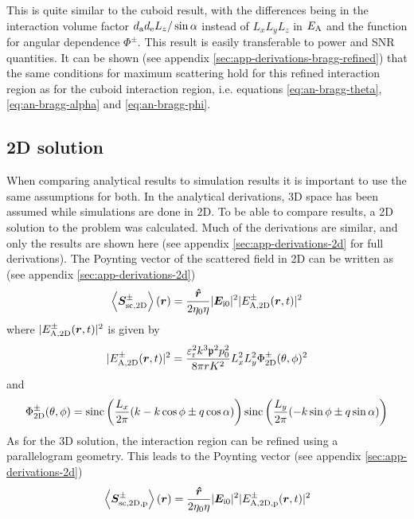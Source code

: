\documentclass[11pt,twoside]{eitExjobb}
\begin{document}
	This is quite similar to the cuboid result, with the differences being in the interaction volume factor $d_{\mathrm{a}} d_{\mathrm{e}} L_{z}/\sin{\alpha}$ instead of $L_x L_y L_z$ in $E_{\mathrm{A}}$ and the function for angular dependence $\Phi^\pm$. This result is easily transferable to power and SNR quantities. It can be shown (see appendix \ref{sec:app-derivations-bragg-refined}) that the same conditions for maximum scattering hold for this refined interaction region as for the cuboid interaction region, i.e. equations \eqref{eq:an-bragg-theta}, \eqref{eq:an-bragg-alpha} and \eqref{eq:an-bragg-phi}.
	
	\subsection{2D solution}
	When comparing analytical results to simulation results it is important to use the same assumptions for both. In the analytical derivations, 3D space has been assumed while simulations are done in 2D. To be able to compare results, a 2D solution to the problem was calculated. Much of the derivations are similar, and only the results are shown here (see appendix \ref{sec:app-derivations-2d} for full derivations). The Poynting vector of the scattered field in 2D can be written as (see appendix \ref{sec:app-derivations-2d})
	\begin{equation}
		\left< \bm{S}_{\mathrm{sc,2D}}^\pm \right> (\bm{r}) = \frac{\bm{\hat{r}}}{2\eta_0 \eta} |\bm{E}_{\mathrm{i}0}|^2 |E_{\mathrm{A,2D}}^\pm (\bm{r},t)|^2
		\label{eq:an-2d-power-cuboid}
	\end{equation}
	where $|E_{\mathrm{A,2D}}^\pm (\bm{r},t)|^2$ is given by
	\begin{equation*}
		|E_{\mathrm{A,2D}}^\pm (\bm{r},t)|^2 = \frac{\varepsilon_{\mathrm{r}}^2 k^3 \mathfrak{p}^2 p_0^2}{8\pi r K^2} L_{x}^2 L_{y}^2 \Phi_{\mathrm{2D}}^\pm (\theta,\phi)^2
	\end{equation*}
	and
	\begin{equation*}
		\Phi_{\mathrm{2D}}^\pm (\theta,\phi) = \text{sinc} \left( \frac{L_{x}}{2\pi} ( k - k\cos{\phi} \pm q\cos{\alpha} ) \right) \text{sinc} \left( \frac{L_{y}}{2\pi} ( - k\sin{\phi} \pm q\sin{\alpha} ) \right)
	\end{equation*}
	As for the 3D solution, the interaction region can be refined using a parallelogram geometry. This leads to the Poynting vector (see appendix \ref{sec:app-derivations-2d})
	\begin{equation}
		\left< \bm{S}_{\mathrm{sc,2D,p}}^\pm \right> (\bm{r}) = \frac{\bm{\hat{r}}}{2\eta_0 \eta} |\bm{E}_{\mathrm{i}0}|^2 |E_{\mathrm{A,2D,p}}^\pm (\bm{r},t)|^2
		\label{eq:an-2d-power-parallelogram}
	\end{equation}
\end{document}

